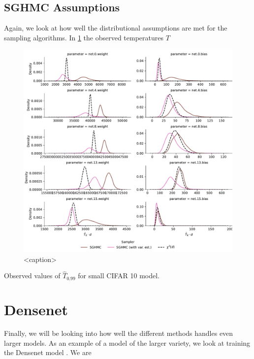 \subsection{SGHMC Assumptions}
Again, we look at how well the distributional assumptions are met for the sampling algorithms.
In \cref{fig:cifar-small-temperatures} the observed temperatures $T$
\begin{figure}[htbp]
    \centering
    \includegraphics[width=\linewidth]{Figures/cifar-small-temperatures.pdf}
    \caption{<caption>}
    \label{fig:cifar-small-temperatures}
\end{figure}

\begin{table}[htbp]
    \centering
    
    \caption{Observed values of $\hat{T}_{0.99}$ for small CIFAR 10 model.}
    \label{tab:cifar-small-temperatures}
\end{table}

\FloatBarrier
\section{Densenet}
Finally, we will be looking into how well the different methods handles even larger models.
As an example of a model of the larger variety, we look at training the Densenet model \cite{huang_densely_2017}.
We are 

